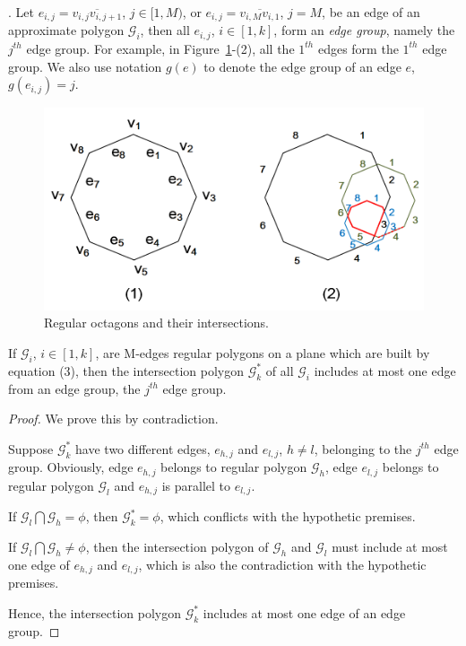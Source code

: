 .
Let $e_{i,j} = \overline{v_{i,j}v_{i,j+1}}$, $j\in [1,M)$, or $e_{i,j} = \overline{v_{i,M}v_{i,1}}$, $j = M$, be an edge of an approximate polygon
$\mathcal{G}_i$, then all $e_{i,j}$, $i\in [1, k]$, form an \emph{edge group}, namely the $j^{th}$ edge group.
%
For example, in Figure~\ref{fig:polygons}-(2), all the $1^{th}$ edges form the $1^{th}$ edge group.
%
We also use notation $g(e)$ to denote the edge group of an edge $e$, \ie $g(e_{i,j})=j$.



\begin{figure}[tb!]
\centering
\includegraphics[scale=0.88]{figures/Fig-polygons.png}
\vspace{-1ex}
\caption{\small Regular octagons and their intersections.}
\vspace{-3ex}
\label{fig:polygons}
\end{figure}



\begin{theorem}
\label{prop-rp-intersection}
If $\mathcal{G}_i$, $i \in [1, k]$, are M-edges regular polygons on a plane which are built by equation (3), then the intersection polygon
$\mathcal{G}^*_k$ of all $\mathcal{G}_i$ includes at most one edge from an edge group, \eg the $j^{th}$ edge group.
\end{theorem}


\begin{proof}
We prove this by contradiction.

Suppose $\mathcal{G}^*_k$ have two different edges, $e_{h,j}$ and $e_{l,j}$, $h\ne l$, belonging to the $j^{th}$ edge group. Obviously, edge
$e_{h,j}$ belongs to regular polygon $\mathcal{G}_h$, edge $e_{l,j}$ belongs to regular polygon $\mathcal{G}_l$ and $e_{h,j}$ is parallel to
$e_{l,j}$.

If $\mathcal{G}_l \bigcap \mathcal{G}_h = \phi$, then $\mathcal{G}^*_k=\phi$, which conflicts with the hypothetic premises.

If $\mathcal{G}_l \bigcap \mathcal{G}_h \ne \phi$, then the intersection polygon of $\mathcal{G}_h$ and $\mathcal{G}_l$ must include at most
one edge of $e_{h,j}$ and $e_{l,j}$, which is also the contradiction with the hypothetic premises.

Hence, the intersection polygon $\mathcal{G}^*_k$ includes at most one edge of an edge group.
%
\end{proof}



